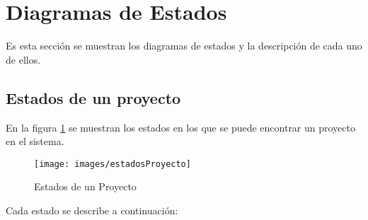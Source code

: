 \section{Diagramas de Estados}
\label{sec:diagramaEstados}

Es esta sección se muestran los diagramas de estados y la descripción de cada uno de ellos.

\subsection{Estados de un proyecto}

En la figura \ref{estadosProyecto} se muestran los estados en los que se puede encontrar un proyecto en el sistema.

\begin{figure}[H]
	\texttt{[image: images/estadosProyecto]}
	\caption{Estados de un Proyecto}
	\label{estadosProyecto}
\end{figure}

	Cada estado se describe a continuación:

